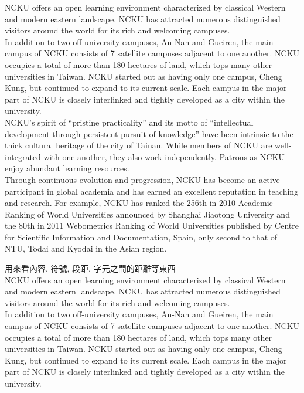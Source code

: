 NCKU offers an open learning environment characterized by classical Western and modern eastern landscape. NCKU has attracted numerous distinguished visitors around the world for its rich and welcoming campuses.\\
In addition to two off-university campuses, An-Nan and Gueiren, the main campus of NCKU consists of 7 satellite campuses adjacent to one another. NCKU occupies a total of more than 180 hectares of land, which tops many other universities in Taiwan. NCKU started out as having only one campus, Cheng Kung, but continued to expand to its current scale. Each campus in the major part of NCKU is closely interlinked and tightly developed as a city within the university.\\
NCKU's spirit of ``pristine practicality'' and its motto of ``intellectual development through persistent pursuit of knowledge'' have been intrinsic to the thick cultural heritage of the city of Tainan. While members of NCKU are well-integrated with one another, they also work independently. Patrons as NCKU enjoy abundant learning resources.\\
Through continuous evolution and progression, NCKU has become an active participant in global academia and has earned an excellent reputation in teaching and research. For example, NCKU has ranked the 256th in 2010 Academic Ranking of World Universities announced by Shanghai Jiaotong University and the 80th in 2011 Webometrics Ranking of World Universities published by Centre for Scientific Information and Documentation, Spain, only second to that of NTU, Todai and Kyodai in the Asian region.



\newpage
{}
用來看內容, 符號, 段距, 字元之間的距離等東西\\

NCKU offers an open learning environment characterized by classical Western and modern eastern landscape. NCKU has attracted numerous distinguished visitors around the world for its rich and welcoming campuses.\\

In addition to two off-university campuses, An-Nan and Gueiren, the main campus of NCKU consists of 7 satellite campuses adjacent to one another. NCKU occupies a total of more than 180 hectares of land, which tops many other universities in Taiwan. NCKU started out as having only one campus, Cheng Kung, but continued to expand to its current scale. Each campus in the major part of NCKU is closely interlinked and tightly developed as a city within the university.\\

